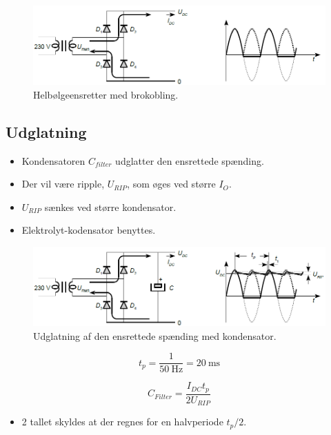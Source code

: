 \documentclass[danish]{article}
\begin{document}
\begin{figure} [H]
	\centering
	\includegraphics[width=\linewidth]{graphics/ensretning}
	\caption{Helbølgeensretter med brokobling.}
	\label{fig:ensretter}
\end{figure}

\subsection{Udglatning}
\begin{itemize}
	\item Kondensatoren $C_{filter}$ udglatter den ensrettede spænding.
	\item Der vil være ripple, $U_{RIP}$, som øges ved større $I_O$.
	\item $U_{RIP}$ sænkes ved større kondensator.
	\item Elektrolyt-kodensator benyttes.
\end{itemize}

\begin{figure} [H]
	\centering
	\includegraphics[width=\linewidth]{graphics/udglatning}
	\caption{Udglatning af den ensrettede spænding med kondensator.}
	\label{fig:udglatning}
\end{figure}


\begin{equation}
t_p = \dfrac{1}{\SI{50}{\hertz}} = \SI{20}{\milli\second}
\end{equation}

\begin{equation}
C_{Filter} = \dfrac{I_{DC}t_p}{2 U_{RIP}}
\end{equation}

\begin{itemize}
	\item 2 tallet skyldes at der regnes for en halvperiode $t_p/2$.
\end{itemize}
\end{document}
